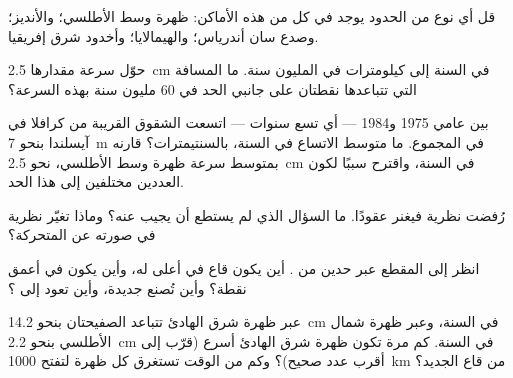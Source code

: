 \begin{exercise}[$\star\star$]\label{exo:g7:plate-tectonics:6}
قل أي نوع من الحدود يوجد في كل من هذه الأماكن:
ظهرة وسط الأطلسي؛ والأنديز؛ وصدع سان أندرياس؛ والهيمالايا؛
وأخدود شرق إفريقيا.
\end{exercise}

\begin{exercise}[$\star\star$]\label{exo:g7:plate-tectonics:7}
حوّل سرعة مقدارها \qty{2.5}{cm} في السنة إلى كيلومترات في المليون
سنة. ما المسافة التي تتباعدها نقطتان على جانبي الحد
في 60 مليون سنة بهذه السرعة؟
\end{exercise}

\begin{exercise}[$\star\star$]\label{exo:g7:plate-tectonics:8}
بين عامي 1975 و1984 --- أي تسع سنوات --- اتسعت الشقوق القريبة من  كرافلا
في آيسلندا بنحو \qty{7}{m} في المجموع. ما متوسط
الاتساع في السنة، بالسنتيمترات؟ قارنه بمتوسط سرعة
ظهرة وسط الأطلسي، نحو \qty{2.5}{cm} في السنة، واقترح سببًا لكون
العددين مختلفين إلى هذا الحد.
\end{exercise}

\begin{exercise}[$\star\star$]\label{exo:g7:plate-tectonics:9}
رُفضت نظرية فيغنر عقودًا. ما السؤال الذي لم يستطع أن
يجيب عنه؟ وماذا تغيّر نظرية  في صورته عن
 المتحركة؟
\end{exercise}

\begin{exercise}[$\star\star$]\label{exo:g7:plate-tectonics:10}
انظر إلى المقطع عبر حدين من . أين يكون قاع 
في أعلى  له، وأين يكون في أعمق نقطة؟ وأين تُصنع  جديدة، وأين
تعود  إلى ؟
\end{exercise}

\begin{exercise}[$\star\star\star$]\label{exo:g7:plate-tectonics:11}
عبر ظهرة شرق  الهادئ تتباعد الصفيحتان بنحو \qty{14.2}{cm}
في السنة، وعبر ظهرة شمال الأطلسي بنحو \qty{2.2}{cm} في
السنة. كم مرة تكون ظهرة شرق  الهادئ أسرع (قرّب إلى أقرب
عدد صحيح)؟ وكم من الوقت تستغرق كل ظهرة لتفتح \qty{1000}{km} من قاع
 الجديد؟
\end{exercise}

